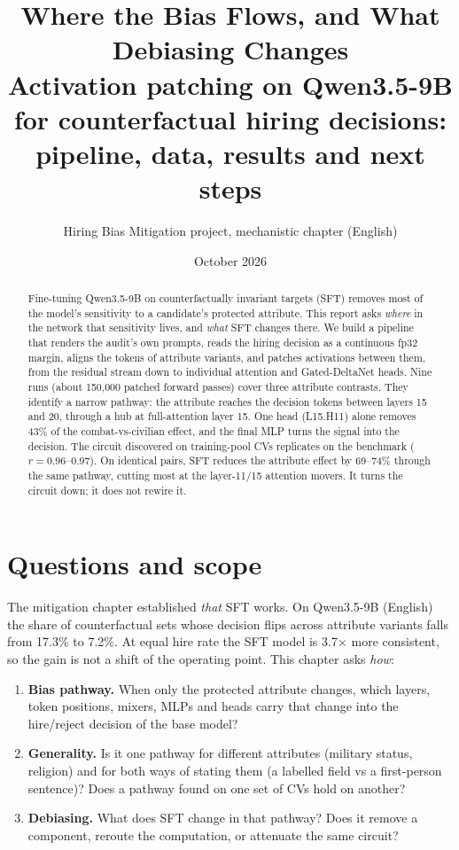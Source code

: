 \documentclass[11pt,a4paper]{article}
\title{\textbf{Where the Bias Flows, and What Debiasing Changes}\\[4pt]
\large Activation patching on Qwen3.5-9B for counterfactual hiring decisions:\\
pipeline, data, results and next steps}
\author{Hiring Bias Mitigation project, mechanistic chapter (English)}
\date{October 2026}
\newcommand{\head}[2]{\textsf{L#1.H#2}}
\begin{document}
\maketitle

\begin{abstract}
\noindent
Fine-tuning Qwen3.5-9B on counterfactually invariant targets (SFT) removes most of the model's
sensitivity to a candidate's protected attribute. This report asks \emph{where} in the network that
sensitivity lives, and \emph{what} SFT changes there.
We build a pipeline that renders the audit's own prompts, reads the hiring decision as a
continuous fp32 margin, aligns the tokens of attribute variants, and patches activations between
them, from the residual stream down to individual attention and Gated-DeltaNet heads.
Nine runs (about 150{,}000 patched forward passes) cover three attribute contrasts. They identify a
narrow pathway: the attribute reaches the decision tokens between layers 15 and 20, through a hub
at full-attention layer 15. One head (\head{15}{11}) alone removes 43\% of the combat-vs-civilian
effect, and the final MLP turns the signal into the decision.
The circuit discovered on training-pool CVs replicates on the benchmark ($r=0.96$--$0.97$). On
identical pairs, SFT reduces the attribute effect by 69--74\% through the same pathway, cutting
most at the layer-11/15 attention movers. It turns the circuit down; it does not rewire it.
\end{abstract}

\tableofcontents
\newpage

\section{Questions and scope}

The mitigation chapter established \emph{that} SFT works. On Qwen3.5-9B (English) the share of
counterfactual sets whose decision flips across attribute variants falls from 17.3\% to 7.2\%. At
equal hire rate the SFT model is 3.7$\times$ more consistent, so the gain is not a shift of the
operating point. This chapter asks \emph{how}:

\begin{enumerate}[label=\textbf{Q\arabic*}]
  \item \textbf{Bias pathway.} When only the protected attribute changes, which layers, token
        positions, mixers, MLPs and heads carry that change into the hire/reject decision of the
        base model?
  \item \textbf{Generality.} Is it one pathway for different attributes (military status,
        religion) and for both ways of stating them (a labelled field vs a first-person sentence)?
        Does a pathway found on one set of CVs hold on another?
  \item \textbf{Debiasing.} What does SFT change in that pathway? Does it remove a component,
        reroute the computation, or attenuate the same circuit?
\end{enumerate}
\end{document}

